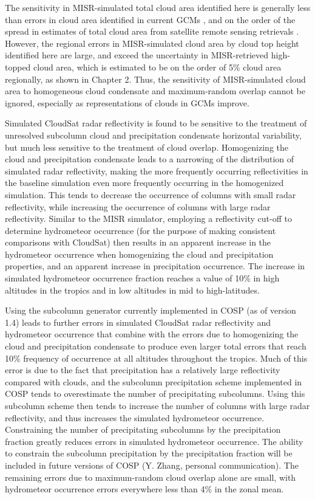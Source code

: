 The sensitivity in MISR-simulated total cloud area identified here is
generally less than errors in cloud area identified in current GCMs
\citep{kay_et_al_2012, klein_et_al_2013, bodas-salcedo_et_al_2011}, and
on the order of the spread in estimates of total cloud area from
satellite remote sensing retrievals
\citep{marchand_et_al_2010, pincus_et_al_2012}. However, the regional
errors in MISR-simulated cloud area by cloud top height identified here
are large, and exceed the uncertainty in MISR-retrieved high-topped
cloud area, which is estimated to be on the order of 5\% cloud area
regionally, as shown in Chapter 2. Thus, the sensitivity of
MISR-simulated cloud area to homogeneous cloud condensate and
maximum-random overlap cannot be ignored, especially as representations
of clouds in GCMs improve.

Simulated CloudSat radar reflectivity is found to be sensitive to the
treatment of unresolved subcolumn cloud and precipitation condensate
horizontal variability, but much less sensitive to the treatment of
cloud overlap. Homogenizing the cloud and precipitation condensate leads
to a narrowing of the distribution of simulated radar reflectivity,
making the more frequently occurring reflectivities in the baseline
simulation even more frequently occurring in the homogenized simulation.
This tends to decrease the occurrence of columns with small radar
reflectivity, while increasing the occurrence of columns with large
radar reflectivity. Similar to the MISR simulator, employing a
reflectivity cut-off to determine hydrometeor occurrence (for the
purpose of making consistent comparisons with CloudSat) then results in
an apparent increase in the hydrometeor occurrence when homogenizing the
cloud and precipitation properties, and an apparent increase in
precipitation occurrence. The increase in simulated hydrometeor
occurrence fraction reaches a value of 10\% in high altitudes in the
tropics and in low altitudes in mid to high-latitudes.

Using the subcolumn generator currently implemented in COSP (as of
version 1.4) leads to further errors in simulated CloudSat radar
reflectivity and hydrometeor occurrence that combine with the errors due
to homogenizing the cloud and precipitation condensate to produce even
larger total errors that reach 10\% frequency of occurrence at all
altitudes throughout the tropics. Much of this error is due to the fact
that precipitation has a relatively large reflectivity compared with
clouds, and the subcolumn precipitation scheme implemented in COSP tends
to overestimate the number of precipitating subcolumns. Using this
subcolumn scheme then tends to increase the number of columns with large
radar reflectivity, and thus increases the simulated hydrometeor
occurrence. Constraining the number of precipitating subcolumns by the
precipitation fraction greatly reduces errors in simulated hydrometeor
occurrence. The ability to constrain the subcolumn precipitation by the
precipitation fraction will be included in future versions of COSP (Y.
Zhang, personal communication). The remaining errors due to
maximum-random cloud overlap alone are small, with hydrometeor
occurrence errors everywhere less than 4\% in the zonal mean.

